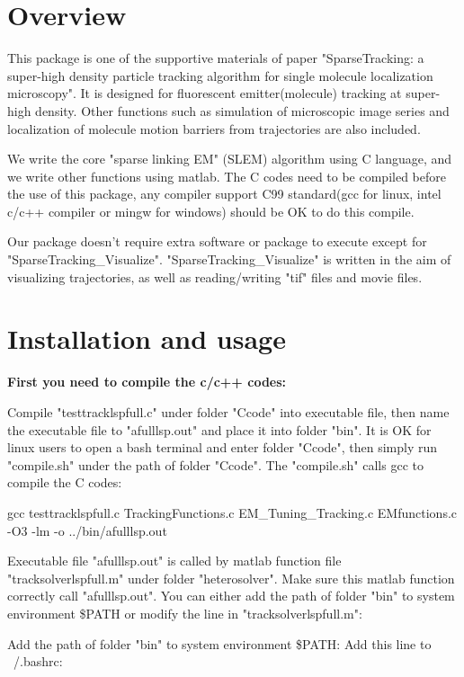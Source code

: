 \documentclass[a4paper]{article}
\begin{document}
\begin{CJK*}{UTF8}{kai}

\section{Overview}
This package is one of the supportive materials of paper "SparseTracking: a super-high density particle tracking algorithm for single molecule localization microscopy". 
It is designed for fluorescent emitter(molecule) tracking at super-high density. 
Other functions such as simulation of microscopic image series and localization of molecule motion barriers from trajectories are also included.

We write the core "sparse linking EM" (SLEM) algorithm using C language, and we write other functions using matlab. 
The C codes need to be compiled before the use of this package, any compiler support C99 standard(gcc for linux, intel c/c++ compiler or mingw for windows) should be OK to do this compile.

Our package doesn't require extra software or package to execute except for "SparseTracking\_Visualize".
"SparseTracking\_Visualize" is written in the aim of visualizing trajectories, as well as reading/writing "tif" files and movie files.

\section{Installation and usage}

\textbf{First you need to compile the c/c++ codes:}
 
Compile "testtracklspfull.c" under folder "Ccode" into executable file, then name the executable file to "afulllsp.out" and place it into folder "bin". 
It is OK for linux users to open a bash terminal and enter folder "Ccode", then simply run "compile.sh" under the path of folder "Ccode". 
The "compile.sh" calls gcc to compile the C codes:

gcc testtracklspfull.c TrackingFunctions.c EM\_Tuning\_Tracking.c EMfunctions.c -O3 -lm -o ../bin/afulllsp.out

Executable file "afulllsp.out" is called by matlab function file "tracksolverlspfull.m" under folder "heterosolver".
Make sure this matlab function correctly call "afulllsp.out". 
You can either add the path of folder "bin" to system environment \$PATH or modify the line in "tracksolverlspfull.m":

Add the path of folder "bin" to system environment \$PATH: Add this line to ~/.bashrc:


\end{CJK*}
\end{document}
